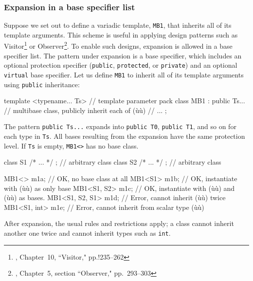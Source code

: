 \subsubsection[Expansion in a base specifier list]{Expansion in a base specifier list}\label{expansion-in-a-base-specifier-list}

Suppose we set out to define a variadic template, \lstinline!MB1!, that
inherits all of its template arguments. This scheme is useful in
applying design patterns such as Visitor{\cprotect\footnote{\cite{alexandrescu01},
  Chapter~10, ``Visitor," pp.!235--262}} or
Observer{\cprotect\footnote{\cite{gamma95}, Chapter~5, section
  ``Observer," pp.~293--303}}. To enable such designs, expansion is
allowed in a base specifier list. The pattern under expansion is a base
specifier, which includes an optional protection specifier
(\lstinline!public!, \lstinline!protected!, or \lstinline!private!) and an
optional \lstinline!virtual! base specifier. Let us define \lstinline!MB1! to
inherit all of its template arguments using \lstinline!public! inheritance:

\begin{emcppslisting}
template <typename... Ts>  // template parameter pack
class MB1 : public Ts...   // multibase class, publicly inherit each of (ù{}ù)
{
    // ...
};
\end{emcppslisting}
    

\noindent The pattern \lstinline!public!~\lstinline!Ts...! expands into
\lstinline!public!~\lstinline!T0!, \lstinline!public!~\lstinline!T1!, and so on for
each type in \lstinline!Ts!. All bases resulting from the expansion have
the same protection level. If \lstinline!Ts! is empty, \lstinline!MB1<>! has
no base class.

\begin{emcppslisting}
class S1 { /* ... */ };  // arbitrary class
class S2 { /* ... */ };  // arbitrary class

MB1<>           m1a;     // OK, no base class at all
MB1<S1>         m1b;     // OK, instantiate with (ù{}ù) as only base
MB1<S1, S2>     m1c;     // OK, instantiate with (ù{}ù) and (ù{}ù) as bases.
MB1<S1, S2, S1> m1d;     // Error, cannot inherit (ù{}ù) twice
MB1<S1, int>    m1e;     // Error, cannot inherit from scalar type (ù{}ù)
\end{emcppslisting}
    

\noindent After expansion, the usual rules and restrictions apply; a class cannot
inherit another one twice and cannot inherit types such as \lstinline!int!.

